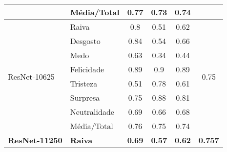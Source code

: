 \begin{table}[]
\begin{tabular}{llcccc}
                                         & Média/Total           & 0.77                                  & 0.73                                   & 0.74                                  &                                       \\ \hline
\multirow{8}{*}{ResNet-10625}          & Raiva                 & 0.8                                   & 0.51                                   & 0.62                                  & \multirow{8}{*}{0.75}                 \\
                                         & Desgosto              & 0.84                                  & 0.54                                   & 0.66                                  &                                       \\
                                         & Medo                  & 0.63                                  & 0.34                                   & 0.44                                  &                                       \\
                                         & Felicidade            & 0.89                                  & 0.9                                    & 0.89                                  &                                       \\
                                         & Tristeza              & 0.51                                  & 0.78                                   & 0.61                                  &                                       \\
                                         & Surpresa              & 0.75                                  & 0.88                                   & 0.81                                  &                                       \\
                                         & Neutralidade          & 0.69                                  & 0.66                                   & 0.68                                  &                                       \\
                                         & Média/Total           & 0.76                                  & 0.75                                   & 0.74                                  &                                       \\ \hline
\multirow{8}{*}{\textbf{ResNet-11250}} & \textbf{Raiva}        & \textbf{0.69}                         & \textbf{0.57}                          & \textbf{0.62}                         & \multirow{8}{*}{\textbf{0.757}}       \\

\end{tabular}
\end{table}
